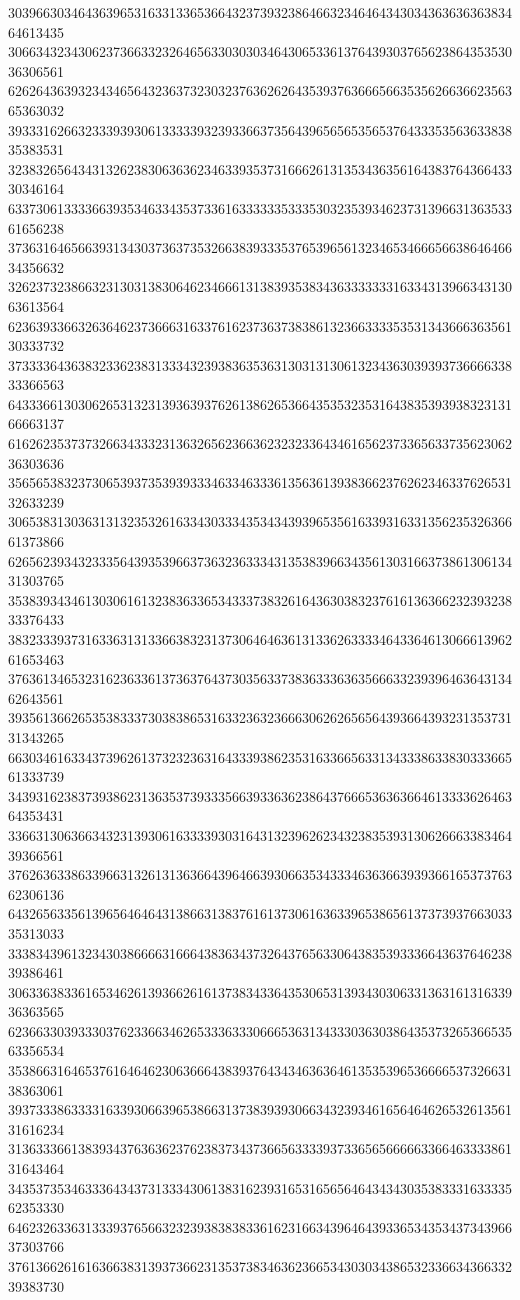 30396630346436396531633133653664323739323864663234646434303436363636383464613435
30663432343062373663323264656330303034643065336137643930376562386435353036306561
62626436393234346564323637323032376362626435393763666566353562663662356365363032
39333162663233393930613333393239336637356439656565356537643335356363383835383531
32383265643431326238306363623463393537316662613135343635616438376436643330346164
63373061333366393534633435373361633333353335303235393462373139663136353361656238
37363164656639313430373637353266383933353765396561323465346665663864646634356632
32623732386632313031383064623466613138393538343633333331633431396634313063613564
62363933663263646237366631633761623736373838613236633335353134366636356130333732
37333364363832336238313334323938363536313031313061323436303939373666633833366563
64333661303062653132313936393762613862653664353532353164383539393832313166663137
61626235373732663433323136326562366362323233643461656237336563373562306236303636
35656538323730653937353939333463346333613563613938366237626234633762653132633239
30653831303631313235326163343033343534343939653561633931633135623532636661373866
62656239343233356439353966373632363334313538396634356130316637386130613431303765
35383934346130306161323836336534333738326164363038323761613636623239323833376433
38323339373163363131336638323137306464636131336263333464336461306661396261653463
37636134653231623633613736376437303563373836333636356663323939646364313462643561
39356136626535383337303838653163323632366630626265656439366439323135373131343265
66303461633437396261373232363164333938623531633665633134333863383033366561333739
34393162383739386231363537393335663933636238643766653636366461333362646364353431
33663130636634323139306163333930316431323962623432383539313062666338346439366561
37626363386339663132613136366439646639306635343334636366393936616537376362306136
64326563356139656464643138663138376161373061636339653865613737393766303335313033
33383439613234303866663166643836343732643765633064383539333664363764623839386461
30633638336165346261393662616137383433643530653139343030633136316131633936363565
62366330393330376233663462653336333066653631343330363038643537326536653563356534
35386631646537616464623063666438393764343463636461353539653666653732663138363061
39373338633331633930663965386631373839393066343239346165646462653261356131616234
31363336613839343763636237623837343736656333393733656566666336646333386131643464
34353735346333643437313334306138316239316531656564643434303538333163333562353330
64623263363133393765663232393838383361623166343964643933653435343734396637303766
37613662616163663831393736623135373834636236653430303438653233663436633239383730
